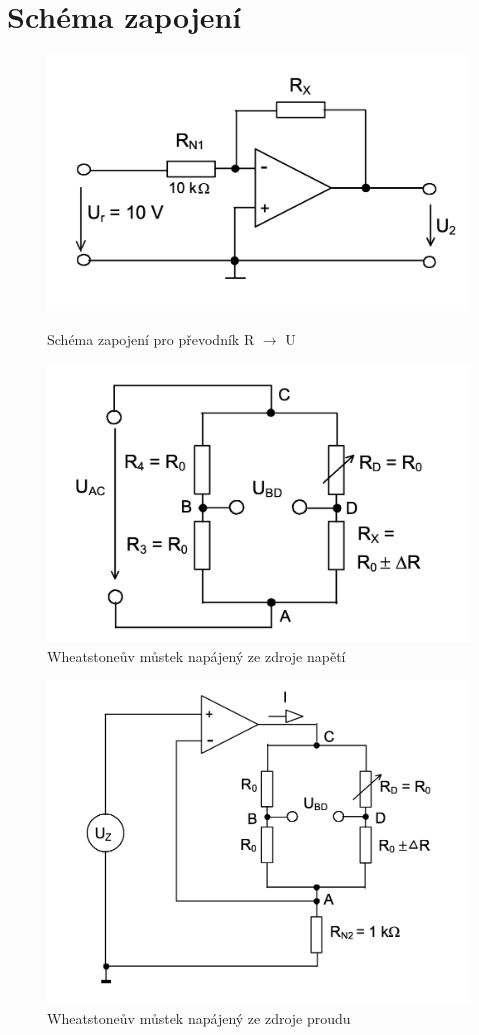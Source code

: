 \documentclass[a4paper,12pt]{article}   %
\begin{document}
\section{Schéma zapojení}
\label{chap:schema_zapojeni}
\begin{figure}[htbp]
  \centering
  \begin{minipage}{.4\textwidth}
    \captionsetup{width=\textwidth}
    \centering
    \includegraphics[width=\textwidth]{ru.png}
    \caption{Schéma zapojení pro převodník R $\rightarrow$ U}
    \label{fig:ru} 
  \end{minipage}
  \begin{minipage}{.4\textwidth}
    \captionsetup{width=.8\textwidth}
    \centering
    \includegraphics[width=\textwidth]{whu.png}
    \caption{Wheatstoneův můstek napájený ze zdroje napětí}
    \label{fig:whu}
  \end{minipage}
\end{figure}
\begin{figure}[h!]
  \centering
  \includegraphics[width=.5\textwidth]{whi.png}
  \caption{Wheatstoneův můstek napájený ze zdroje proudu}
  \label{fig:whi}
\end{figure}
\end{document}
